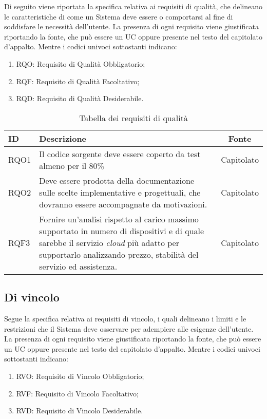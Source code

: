 Di seguito viene riportata la specifica relativa ai requisiti di qualità, che delineano le caratteristiche di come un Sistema
deve essere o comportarsi al fine di soddisfare le necessità dell'utente.
La presenza di ogni requisito viene giustificata riportando la fonte, che può essere un UC oppure presente
nel testo del capitolato d'appalto. Mentre i codici univoci sottostanti indicano:
\begin{enumerate}
	\item RQO: Requisito di Qualità Obbligatorio;
	\item RQF: Requisito di Qualità Facoltativo;
	\item RQD: Requisito di Qualità Desiderabile.
\end{enumerate}

\begin{table}[H]
	\renewcommand{\arraystretch}{1.5}
	\centering
	\begin{tabularx}{\textwidth}{l|X|c}
		\textbf{ID} & \textbf{Descrizione}                                                                                                                                                                                                 & \textbf{Fonte} \\
		\hline
		RQO1        & Il codice sorgente deve essere coperto da test almeno per il 80\%                                                                                                                                                    & Capitolato     \\
		\hline
		RQO2        & Deve essere prodotta della documentazione sulle scelte implementative e progettuali, che dovranno essere accompagnate da motivazioni.                                                                                & Capitolato     \\
		\hline
		RQF3        & Fornire un'analisi rispetto al carico massimo supportato in numero di dispositivi e di quale sarebbe il servizio \textit{cloud} più adatto per supportarlo analizzando prezzo, stabilità del servizio ed assistenza. & Capitolato     \\
		\hline
	\end{tabularx}
	\caption{Tabella dei requisiti di qualità}
\end{table}
\newpage
\subsection{Di vincolo}

Segue la specifica relativa ai requisiti di vincolo, i quali delineano i limiti e le restrizioni che il Sistema deve osservare per adempiere alle esigenze dell'utente.
La presenza di ogni requisito viene giustificata riportando la fonte, che può essere un UC oppure presente
nel testo del capitolato d'appalto. Mentre i codici univoci sottostanti indicano:
\begin{enumerate}
	\item RVO: Requisito di Vincolo Obbligatorio;
	\item RVF: Requisito di Vincolo Facoltativo;
	\item RVD: Requisito di Vincolo Desiderabile.
\end{enumerate}

